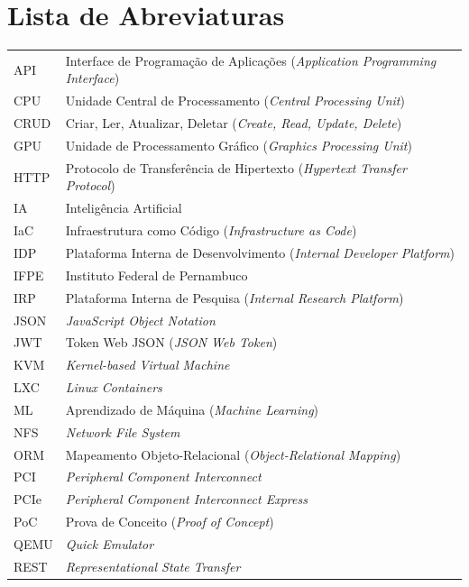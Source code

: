 \chapter*{Lista de Abreviaturas}
\begin{longtable}{ll}
        API	& Interface de Programação de Aplicações (\emph{Application Programming Interface}) \\
        CPU & Unidade Central de Processamento (\emph{Central Processing Unit}) \\
        CRUD & Criar, Ler, Atualizar, Deletar (\emph{Create, Read, Update, Delete}) \\
        GPU & Unidade de Processamento Gráfico (\emph{Graphics Processing Unit}) \\
        HTTP & Protocolo de Transferência de Hipertexto (\emph{Hypertext Transfer Protocol}) \\
        IA & Inteligência Artificial \\
        IaC	& Infraestrutura como Código (\emph{Infrastructure as Code}) \\
        IDP & Plataforma Interna de Desenvolvimento (\emph{Internal Developer Platform}) \\
        IFPE & Instituto Federal de Pernambuco \\
        IRP & Plataforma Interna de Pesquisa (\emph{Internal Research Platform}) \\
        JSON & \emph{JavaScript Object Notation} \\
        JWT & Token Web JSON (\emph{JSON Web Token}) \\
        KVM & \emph{Kernel-based Virtual Machine} \\
        LXC & \emph{Linux Containers} \\
        ML & Aprendizado de Máquina (\emph{Machine Learning}) \\
        NFS & \emph{Network File System} \\
        ORM & Mapeamento Objeto-Relacional (\emph{Object-Relational Mapping}) \\
        PCI & \emph{Peripheral Component Interconnect} \\
        PCIe & \emph{Peripheral Component Interconnect Express} \\
        PoC & Prova de Conceito (\emph{Proof of Concept}) \\
        QEMU & \emph{Quick Emulator} \\
        REST & \emph{Representational State Transfer} \\

\end{longtable}
